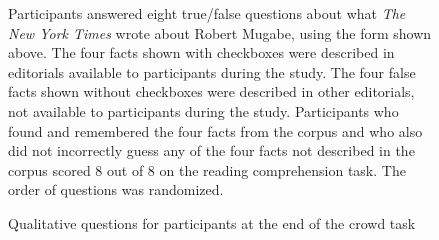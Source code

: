 \begin{figure}[h]
\caption{Participants answered eight true/false questions about what \textit{The New York Times} wrote about Robert Mugabe, using the form shown above. The four facts shown with checkboxes were described in editorials available to participants during the study. 
The four false facts shown without checkboxes were described in other editorials, not available to participants during the study. 
Participants who found and remembered the four facts from the corpus and who also did not incorrectly guess any of the four facts not described in the corpus scored 8 out of 8 on the reading comprehension task.
The order of questions was randomized.}
\end{figure}


\begin{figure}[h]
\caption{Qualitative questions for participants at the end of the crowd task}
\end{figure}